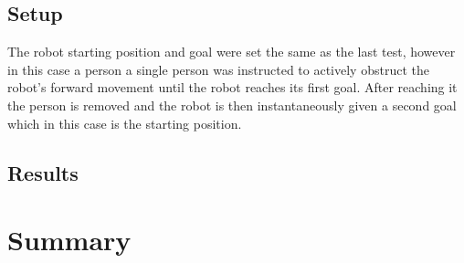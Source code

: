 \subsection{Setup}
The robot starting position and goal were set the same as the last test, however in this case a person a single person was instructed to actively obstruct the robot's forward movement until the robot reaches its first goal. After reaching it the person is removed and the robot is then instantaneously given a second goal which in this case is the starting position.
\subsection{Results}
\section{Summary}
